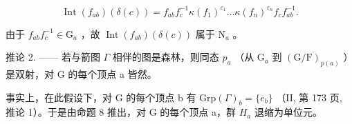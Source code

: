 \[
\operatorname{Int} (f _ {a b}) (\delta (c)) = f _ {a b} f _ {c} ^ {- 1} \kappa (f _ {1}) ^ {\varepsilon_ {1}} \dots \kappa (f _ {n}) ^ {\varepsilon_ {n}} f _ {c} f _ {a b} ^ {- 1}.
\]

由于 \(f_{ab}f_c^{-1} \in \mathrm{G}_a\) ，故 \(\operatorname{Int}(f_{ab})(\delta(c))\) 属于 \(\mathrm{N}_a\) 。

推论 2. —— 若与箭图 \(\Gamma\) 相伴的图是森林，则同态 \(p_a\) （从 \(\mathrm{G}_a\) 到 \((\mathrm{G} / \mathrm{F})_{p(a)}\) ）是双射，对 G 的每个顶点 a 皆然。

事实上，在此假设下，对 G 的每个顶点 b 有 \(\mathrm{Grp}(\Gamma)_{b}=\{e_{b}\}\) （II, 第 173 页, 推论 1）。于是由命题 8 推出，对 G 的每个顶点 a，群 \(H_{a}\) 退缩为单位元。

